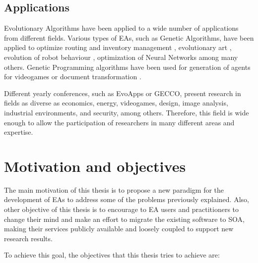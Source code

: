 \subsection{Applications}
Evolutionary Algorithms have been applied to a wide number of applications from different fields. Various types of EAs, such as Genetic Algorithms, have been applied to optimize routing and inventory management \cite{Esparcia2009EVITA}, evolutionary art \cite{Garcia2013RGB}, evolution of robot behaviour \cite{Garcia2012testing}, optimization of Neural Networks \cite{Castillo1999gprop} among many others. Genetic Programming algorithms have been used for generation of agents for videogames \cite{Esparcia2013GPunreal} or document transformation \cite{Garcia2008XSLT}. 

Different yearly conferences, such as EvoApps or GECCO, %
present research in fields as diverse as economics, energy,
videogames, design, image analysis, industrial environments, and
security, among others. Therefore, this field is wide enough to allow
the participation of researchers in many different areas and
expertise. %







\section{Motivation and objectives} %
\label{sec:intro:motivation}
The main motivation of this thesis is to propose a new paradigm for the development of EAs to address some of the problems previously explained. Also, other objective of this thesis is to encourage to EA users and practitioners to change their mind and make an effort to migrate the existing software to SOA, making their services publicly available and loosely coupled to support new research results.

To achieve this goal, the objectives that this thesis tries to achieve are:

